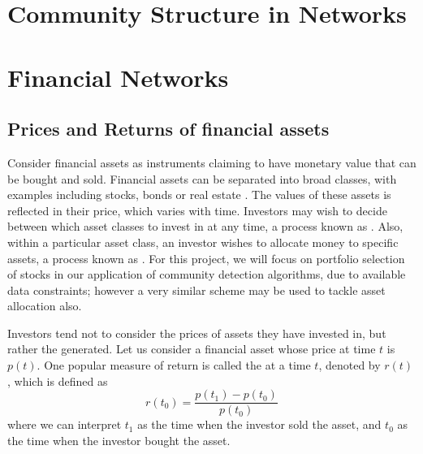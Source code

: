 
\section{Community Structure in Networks}
\label{sec:communityStructureBackground}


\section{Financial Networks}
\label{sec:financialNetworksBackground}

\subsection{Prices and Returns of financial assets}
\label{subsec:financialAssetsBackground}

Consider financial assets as instruments claiming to have monetary value that can be bought and sold. Financial assets can be separated into broad classes, with examples including stocks, bonds or real estate \cite{Kuh12d,BKM13}.
The values of these assets is reflected in their price, which varies with time. Investors may wish to decide between which asset classes to invest in at any time, a process known as  \cite{BKM13}.
Also, within a particular asset class, an investor wishes to allocate money to specific assets, a process known as  \cite{BKM13}.
For this project, we will focus on portfolio selection of stocks in our application of community detection algorithms, due to available data constraints; however a very similar scheme may be used to tackle asset allocation also.

Investors tend not to consider the prices of assets they have invested in, but rather the  generated. Let us consider a financial asset whose price at time $t$ is $p(t)$. One popular measure of return is called the  \cite{Kuh12e,BKM13} at a time $t$, denoted by $r(t)$, which is defined as
\begin{equation}
	\label{eq:rateOfReturn}
	r(t_{0}) = \frac{p(t_{1}) - p(t_{0})}{p(t_{0})}
\end{equation}
where we can interpret $t_{1}$ as the time when the investor sold the asset, and $t_{0}$ as the time when the investor bought the asset.

